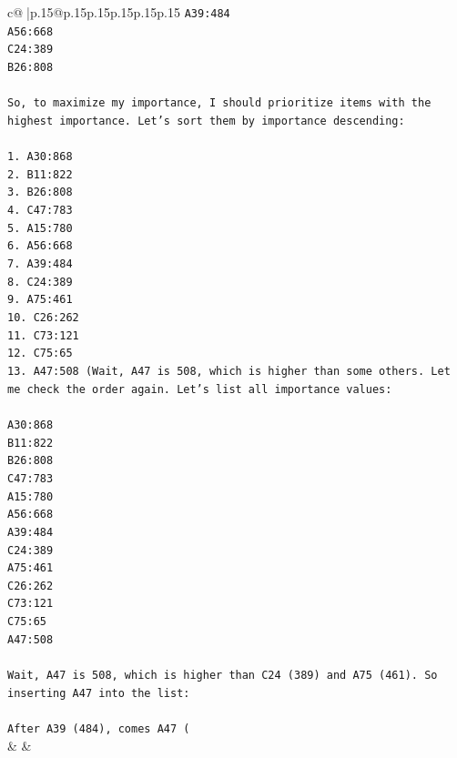 \documentclass{article}
\begin{document}
{\begin{supertabular}{c@{$\;$}|p{.15\linewidth}@{}p{.15\linewidth}p{.15\linewidth}p{.15\linewidth}p{.15\linewidth}p{.15\linewidth}}
{{{\texttt{A39:484} \\
\texttt{A56:668} \\
\texttt{C24:389} \\
\texttt{B26:808} \\
\\ 
\texttt{So, to maximize my importance, I should prioritize items with the highest importance. Let's sort them by importance descending:} \\
\\ 
\texttt{1. A30:868} \\
\texttt{2. B11:822} \\
\texttt{3. B26:808} \\
\texttt{4. C47:783} \\
\texttt{5. A15:780} \\
\texttt{6. A56:668} \\
\texttt{7. A39:484} \\
\texttt{8. C24:389} \\
\texttt{9. A75:461} \\
\texttt{10. C26:262} \\
\texttt{11. C73:121} \\
\texttt{12. C75:65} \\
\texttt{13. A47:508 (Wait, A47 is 508, which is higher than some others. Let me check the order again. Let's list all importance values:} \\
\\ 
\texttt{A30:868} \\
\texttt{B11:822} \\
\texttt{B26:808} \\
\texttt{C47:783} \\
\texttt{A15:780} \\
\texttt{A56:668} \\
\texttt{A39:484} \\
\texttt{C24:389} \\
\texttt{A75:461} \\
\texttt{C26:262} \\
\texttt{C73:121} \\
\texttt{C75:65} \\
\texttt{A47:508} \\
\\ 
\texttt{Wait, A47 is 508, which is higher than C24 (389) and A75 (461). So inserting A47 into the list:} \\
\\ 
\texttt{After A39 (484), comes A47 (} \\
            }
        }
    }
    & & \\ \\


\end{supertabular}}
\end{document}
